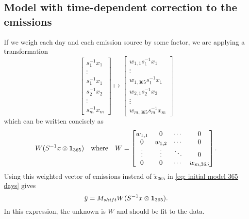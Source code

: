 \documentclass{article}
\begin{document}
\subsection{Model with time-dependent correction to the emissions}
If we weigh each day and each emission source by some factor, we are applying a transformation
$$
\begin{bmatrix}
    s_1^{-1} x_1 \\
    \vdots \\
    s_1^{-1} x_1 \\ 
    s_2^{-1} x_2 \\
    \vdots \\ 
    s_m^{-1} x_m
\end{bmatrix}
\mapsto
\begin{bmatrix}
    w_{1,1} s_1^{-1} x_1 \\
    \vdots \\
    w_{1,365} s_1^{-1} x_1 \\ 
    w_{2,1} s_2^{-1} x_2 \\
    \vdots \\ 
    w_{m, 365} s_m^{-1} x_m
\end{bmatrix}
$$
which can be written concisely as 
$$
W (S^{-1} x \otimes \vb{1}_{365})
\quad\text{where}\quad 
W = \begin{bmatrix}
    w_{1,1} & 0 & \cdots & 0 \\
    0 & w_{1,2} & \cdots & 0 \\
    \vdots & \vdots & \ddots & 0 \\
    0 & 0 & \cdots & w_{m, 365}
\end{bmatrix}
.$$
Using this weighted vector of emissions instead of $\tilde{x}_{365}$ in \cref{eq: initial model 365 days} gives
\begin{equation}
    \label{eq: time-evolving model concise}
\hat{y} = M_{shift} W (S^{-1} x \otimes \vb{1}_{365})
.\end{equation}
In this expression, the unknown is $W$ and should be fit to the data. 

\end{document}
